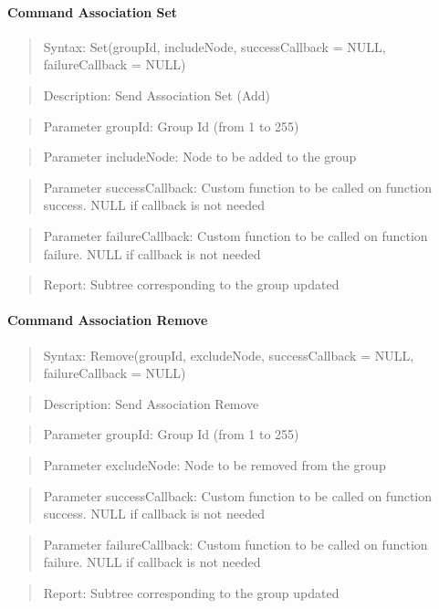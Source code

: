 \paragraph{Command Association Set}
\begin{quote}Syntax: Set(groupId, includeNode, successCallback = NULL, failureCallback = NULL)\end{quote}
\begin{quote}Description: Send Association Set (Add)\end{quote}
\begin{quote}Parameter groupId: Group Id (from 1 to 255)\end{quote}
\begin{quote}Parameter includeNode: Node to be added to the group\end{quote}
\begin{quote}Parameter successCallback: Custom function to be called on function success. NULL if callback is not needed\end{quote}
\begin{quote}Parameter failureCallback: Custom function to be called on function failure. NULL if callback is not needed\end{quote}
\begin{quote}Report: Subtree corresponding to the group updated\end{quote}

\paragraph{Command Association Remove}
\begin{quote}Syntax: Remove(groupId, excludeNode, successCallback = NULL, failureCallback = NULL)\end{quote}
\begin{quote}Description: Send Association Remove\end{quote}
\begin{quote}Parameter groupId: Group Id (from 1 to 255)\end{quote}
\begin{quote}Parameter excludeNode: Node to be removed from the group\end{quote}
\begin{quote}Parameter successCallback: Custom function to be called on function success. NULL if callback is not needed\end{quote}
\begin{quote}Parameter failureCallback: Custom function to be called on function failure. NULL if callback is not needed\end{quote}
\begin{quote}Report: Subtree corresponding to the group updated\end{quote}

